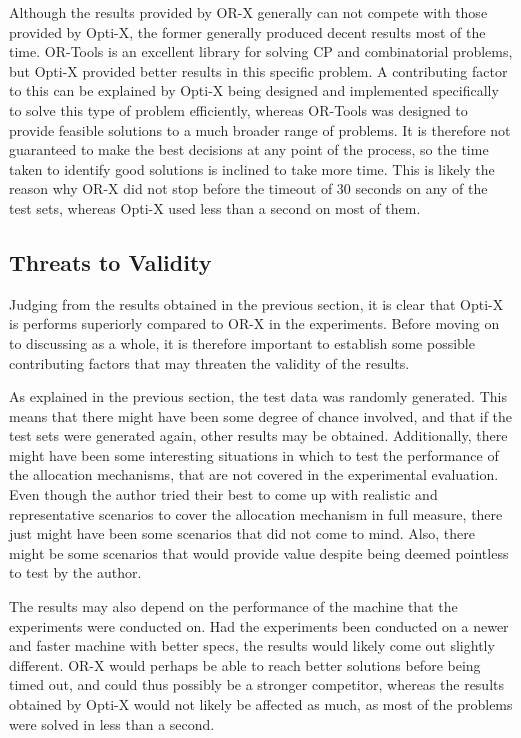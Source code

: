 Although the results provided by OR-X generally can not compete with those provided by Opti-X, the former generally produced decent results most of the time. OR-Tools is an excellent library for solving CP and combinatorial problems, but Opti-X provided better results in this specific problem. A contributing factor to this can be explained by Opti-X being designed and implemented specifically to solve this type of problem efficiently, whereas OR-Tools was designed to provide feasible solutions to a much broader range of problems. It is therefore not guaranteed to make the best decisions at any point of the process, so the time taken to identify good solutions is inclined to take more time. This is likely the reason why OR-X did not stop before the timeout of 30 seconds on any of the test sets, whereas Opti-X used less than a second on most of them.

\subsection{Threats to Validity}

Judging from the results obtained in the previous section, it is clear that Opti-X is performs superiorly compared to OR-X in the experiments. Before moving on to discussing \toolname \space as a whole, it is therefore important to establish some possible contributing factors that may threaten the validity of the results.

As explained in the previous section, the test data was randomly generated. This means that there might have been some degree of chance involved, and that if the test sets were generated again, other results may be obtained. Additionally, there might have been some interesting situations in which to test the performance of the allocation mechanisms, that are not covered in the experimental evaluation. Even though the author tried their best to come up with realistic and representative scenarios to cover the allocation mechanism in full measure, there just might have been some scenarios that did not come to mind. Also, there might be some scenarios that would provide value despite being deemed pointless to test by the author.

The results may also depend on the performance of the machine that the experiments were conducted on. Had the experiments been conducted on a newer and faster machine with better specs, the results would likely come out slightly different. OR-X would perhaps be able to reach better solutions before being timed out, and could thus possibly be a stronger competitor, whereas the results obtained by Opti-X would not likely be affected as much, as most of the problems were solved in less than a second.

